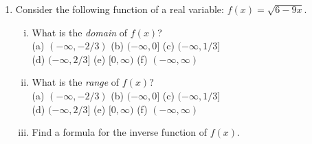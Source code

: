 \documentclass[fleqn,12pt]{article}
\newcommand{\<}{\ensuremath{\langle}}
\renewcommand{\>}{\ensuremath{\rangle}}
\begin{document}
    \begin{enumerate}
    \item
      Consider the following function of a real variable: $f(x) = \sqrt{6 - 9x}$.

      \begin{enumerate}[i.]
      \item 
        What is the \emph{domain} of $f(x)$?
        \\[4pt]
        (a) $(-\infty, -2/3)$ \hfill 
        (b) $(-\infty, 0]$ \hfill
          (c) $(-\infty, 1/3]$ \hfill\\[5pt]
            (d) $(-\infty, 2/3]$ \hfill
              (e) $[0, \infty)$ \hfill
                (f) $(-\infty, \infty)$

                \bigskip
                 {}
                \bigskip

              \item
                What is the \emph{range} of $f(x)$?
                \\[4pt]
                (a) $(-\infty, -2/3)$ \hfill (b) $(-\infty, 0]$ \hfill
              (c) $(-\infty, 1/3]$ \hfill\\[5pt]
                (d) $(-\infty, 2/3]$ \hfill
                  (e) $[0, \infty)$ \hfill
                    (f) $(-\infty, \infty)$

                \bigskip
                 {}
                \bigskip

                  \item
                    Find a formula for the inverse function of $f(x)$.
                    \\\\


\end{enumerate}
\end{enumerate}
\end{document}
